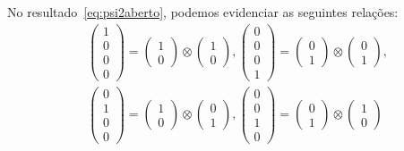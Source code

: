 No resultado~\eqref{eq:psi2aberto}, podemos evidenciar as seguintes relações:
\begin{equation}\label{eq:prodtens1}
	\begin{split}
&\begin{pmatrix}
1 \\
0 \\
0 \\
0
\end{pmatrix} = \begin{pmatrix}
1 \\
0
\end{pmatrix} \otimes \begin{pmatrix}
1 \\
0
\end{pmatrix},
\begin{pmatrix}
0 \\
0 \\
0 \\
1
\end{pmatrix} = \begin{pmatrix}
0 \\
1
\end{pmatrix} \otimes \begin{pmatrix}
0 \\
1
\end{pmatrix}, \\
&\begin{pmatrix}
0 \\
1 \\
0 \\
0
\end{pmatrix} = \begin{pmatrix}
1 \\
0
\end{pmatrix} \otimes \begin{pmatrix}
0 \\
1
\end{pmatrix},
\begin{pmatrix}
0 \\
0 \\
1 \\
0
\end{pmatrix} = \begin{pmatrix}
0 \\
1
\end{pmatrix} \otimes \begin{pmatrix}
1 \\
0
\end{pmatrix} 
	\end{split}
\end{equation}

